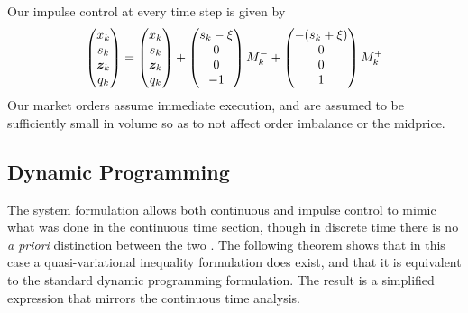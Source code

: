 Our impulse control at every time step is given by
\begin{equation}\label{eq:discretestateimpulse}
\begin{pmatrix}
x_{k} \\
s_{k} \\
\bm{z}_{k} \\
q_{k} 
\end{pmatrix} = \begin{pmatrix}
x_{k} \\
s_{k} \\
\bm{z}_{k} \\
q_{k}
\end{pmatrix}
+ \begin{pmatrix}
s_k - \xi \\
0 \\
0 \\
-1
\end{pmatrix}M_k^-
+ \begin{pmatrix}
- (s_k + \xi) \\
0 \\
0 \\
1
\end{pmatrix} M_k^+
\end{equation}
Our market orders assume immediate execution, and are assumed to be sufficiently small in volume so as to not affect order imbalance or the midprice. 

\subsection{Dynamic Programming}
The system formulation allows both continuous and impulse control to mimic what was done in the continuous time section, though in discrete time there is no \textit{a priori} distinction between the two \cite{Bens08}. The following theorem shows that in this case a quasi-variational inequality formulation does exist, and that it is equivalent to the standard dynamic programming formulation. The result is a simplified expression that mirrors the continuous time analysis.

